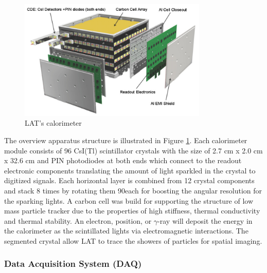 \begin{figure}[h!]
    \centering
    \includegraphics[width=0.8\textwidth]{content/background/figures/fermi_calorimeter.png}
    \caption{LAT's calorimeter \citep{FermiLAT}}
    \label{fig:fermi_calorimeter}
\end{figure}

The overview apparatus structure is illustrated in Figure \ref{fig:fermi_calorimeter}.
Each calorimeter module consists of 96 CsI(Tl) scintillator
crystals with the size of
2.7 cm x 2.0 cm x 32.6 cm and PIN photodiodes at both ends which connect 
to the readout electronic components translating the amount of light 
sparkled in the crystal to digitized signals. Each horizontal 
layer is combined from 12 crystal components and stack 8 times by 
rotating them 90\textdegree each for boosting the angular resolution 
for the sparking lights. A carbon cell was build for supporting 
the structure of low mass particle tracker due to the properties of 
high stiffness, thermal conductivity and thermal stability.
An electron, position, or $\gamma$-ray will deposit the energy in the
calorimeter as the scintillated lights via electromagnetic interactions.
The segmented
crystal allow LAT to trace the showers of particles for spatial imaging.




\subsubsection{Data Acquisition System (DAQ)}


